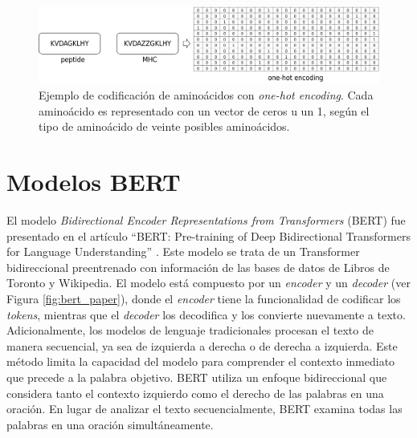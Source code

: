 \begin{figure}[H]
	\centering
	\includegraphics[width=\textwidth]{../img/proposal/onehot}	
	\caption[Ejemplo de codificación de aminoácidos con \textit{one-hot encoding}]{Ejemplo de codificación de aminoácidos con \textit{one-hot encoding}. Cada aminoácido es representado con un vector de ceros u un 1, según el tipo de aminoácido de veinte posibles aminoácidos.}
	\label{fig:onehot}
\end{figure}

\section{Modelos BERT}

El modelo \textit{Bidirectional Encoder Representations from Transformers} (BERT) fue presentado en el artículo ``BERT: Pre-training of Deep Bidirectional Transformers for Language Understanding'' \cite{devlin2018bert}. Este modelo se trata de un Transformer bidireccional preentrenado con información de las bases de datos de Libros de Toronto y Wikipedia. El modelo está compuesto por un \textit{encoder} y un \textit{decoder} (ver Figura \ref{fig:bert_paper}), donde el \textit{encoder} tiene la funcionalidad de codificar los \textit{tokens}, mientras que el \textit{decoder} los decodifica y los convierte nuevamente a texto. Adicionalmente, los modelos de lenguaje tradicionales procesan el texto de manera secuencial, ya sea de izquierda a derecha o de derecha a izquierda. Este método limita la capacidad del modelo para comprender el contexto inmediato que precede a la palabra objetivo. BERT utiliza un enfoque bidireccional que considera tanto el contexto izquierdo como el derecho de las palabras en una oración. En lugar de analizar el texto secuencialmente, BERT examina todas las palabras en una oración simultáneamente.

